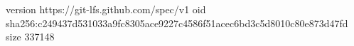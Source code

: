 version https://git-lfs.github.com/spec/v1
oid sha256:c249437d531033a9fc8305ace9227c4586f51acec6bd3c5d8010c80e873d47fd
size 337148
